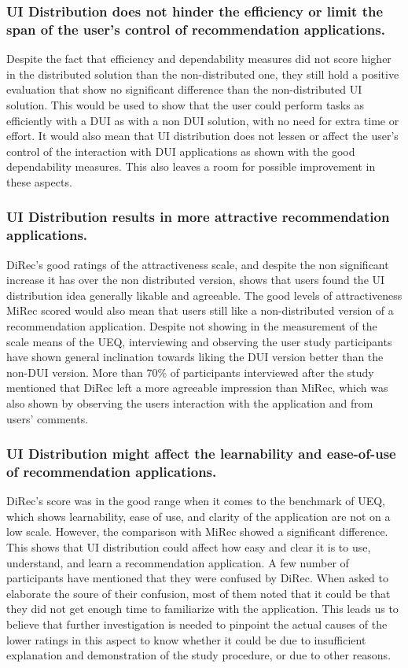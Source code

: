 \subsubsection{UI Distribution does not hinder the efficiency or limit the span
of the user's control of recommendation applications.} Despite the fact that
efficiency and dependability measures did not score higher in the distributed
solution than the non-distributed one, they still hold a positive
evaluation that show no significant difference than the non-distributed UI
solution. This would be used to show that the user could perform tasks as
efficiently with a DUI as with a non DUI solution, with no need for extra time
or effort. It would also mean that UI distribution does not lessen or affect the
user's control of the interaction with DUI applications as shown with the good
dependability measures. This also leaves a room for possible improvement in
these aspects.

\subsubsection{UI Distribution results in more attractive recommendation applications.} DiRec's good ratings of the attractiveness scale, and despite
the non significant increase it has over the non distributed version, shows that
users found the UI distribution idea generally likable and agreeable. The good
levels of attractiveness MiRec scored would also mean that users still like a
non-distributed version of a recommendation application. Despite not showing in
the measurement of the scale means of the UEQ, interviewing and observing the
user study participants have shown general inclination towards liking the DUI
version better than the non-DUI version. More than 70\% of participants 
interviewed after the study mentioned that DiRec left a more agreeable
impression than MiRec, which was also shown by observing the users interaction
with the application and from users' comments.

\subsubsection{UI Distribution might affect the learnability and ease-of-use of recommendation applications.}
DiRec's score was in the good range when it comes to the benchmark of UEQ, which
shows learnability, ease of use, and clarity of the application are not on a low
scale. However, the comparison with MiRec showed a significant difference. This
shows that UI distribution could affect how easy and clear it is to use,
understand, and learn a recommendation application. A few number of participants
have mentioned that they were confused by DiRec. When asked to elaborate the
soure of their confusion, most of them noted that it could be that they did not
get enough time to familiarize with the application. This leads us to believe
that further investigation is needed to pinpoint the actual causes of the
lower ratings in this aspect to know whether it could be due to insufficient
explanation and demonstration of the study procedure, or due to other reasons.
